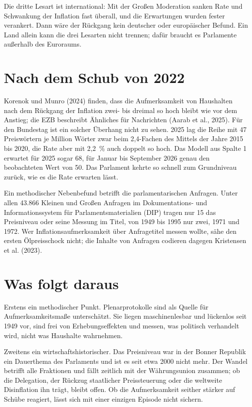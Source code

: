 \documentclass[11pt,a4paper]{article}
\begin{document}
Die dritte Lesart ist international: Mit der Großen Moderation sanken Rate und Schwankung der Inflation fast überall, und die Erwartungen wurden fester verankert. Dann wäre der Rückgang kein deutscher oder europäischer Befund. Ein Land allein kann die drei Lesarten nicht trennen; dafür braucht es Parlamente außerhalb des Euroraums.

\section{Nach dem Schub von 2022}

Korenok und Munro (2024) finden, dass die Aufmerksamkeit von Haushalten nach dem Rückgang der Inflation zwei- bis dreimal so hoch bleibt wie vor dem Anstieg; die EZB beschreibt Ähnliches für Nachrichten (Aarab et al., 2025). Für den Bundestag ist ein solcher Überhang nicht zu sehen. 2025 lag die Reihe mit 47 Preiswörtern je Million Wörter zwar beim 2,4-Fachen des Mittels der Jahre 2015 bis 2020, die Rate aber mit 2,2~\% auch doppelt so hoch. Das Modell aus Spalte 1 erwartet für 2025 sogar 68, für Januar bis September 2026 genau den beobachteten Wert von 50. Das Parlament kehrte so schnell zum Grundniveau zurück, wie es die Rate erwarten lässt.

Ein methodischer Nebenbefund betrifft die parlamentarischen Anfragen. Unter allen 43.866 Kleinen und Großen Anfragen im Dokumentations- und Informationssystem für Parlamentsmaterialien (DIP) tragen nur 15 das Preisniveau oder seine Messung im Titel, von 1949 bis 1995 nur zwei, 1971 und 1972. Wer Inflationsaufmerksamkeit über Anfragetitel messen wollte, sähe den ersten Ölpreisschock nicht; die Inhalte von Anfragen codieren dagegen Kristensen et al. (2023).

\section{Was folgt daraus}

Erstens ein methodischer Punkt. Plenarprotokolle sind als Quelle für Aufmerksamkeitsmaße unterschätzt. Sie liegen maschinenlesbar und lückenlos seit 1949 vor, sind frei von Erhebungseffekten und messen, was politisch verhandelt wird, nicht was Haushalte wahrnehmen.

Zweitens ein wirtschaftshistorischer. Das Preisniveau war in der Bonner Republik ein Dauerthema des Parlaments und ist es seit etwa 2000 nicht mehr. Der Wandel betrifft alle Fraktionen und fällt zeitlich mit der Währungsunion zusammen; ob die Delegation, der Rückzug staatlicher Preissteuerung oder die weltweite Disinflation ihn trägt, bleibt offen. Ob die Aufmerksamkeit seither stärker auf Schübe reagiert, lässt sich mit einer einzigen Episode nicht sichern.
\end{document}
